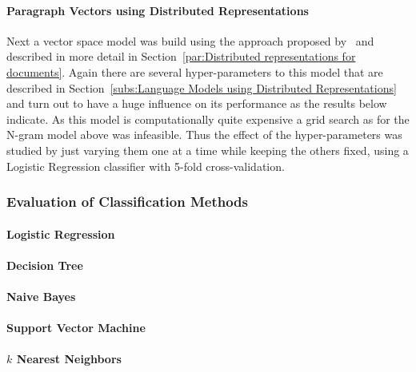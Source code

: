 \paragraph{Paragraph Vectors using Distributed Representations}
\label{par:Paragraph Vectors using Distributed Representations}

Next a vector space model was build using the approach proposed by~\cite{Le:2014aa} and described in more detail in Section~\ref{par:Distributed representations for documents}. Again there are several hyper-parameters to this model that are described in Section~\ref{subs:Language Models using Distributed Representations} and turn out to have a huge influence on its performance as the results below indicate. As this model is computationally quite expensive a grid search as for the N-gram model above was infeasible. Thus the effect of the hyper-parameters was studied by just varying them one at a time while keeping the others fixed, using a Logistic Regression classifier with 5-fold cross-validation.

\subsubsection*{Evaluation of Classification Methods}
\label{subs:Evaluation of Classification Methods}

\paragraph{Logistic Regression}
\label{par:Logistic Regression}

\paragraph{Decision Tree}
\label{par:Decision Tree}

\paragraph{Naive Bayes}
\label{par:Naive Bayes}

\paragraph{Support Vector Machine}
\label{par:Support Vector Machine}

\paragraph{$k$ Nearest Neighbors}
\label{par:k Nearest Neighbors}

